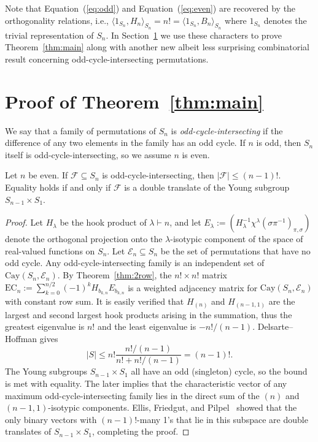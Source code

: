 \documentclass[12pt]{article}
\begin{document}
\noindent Note that Equation~(\ref{eq:odd}) and Equation~(\ref{eq:even}) are recovered by the orthogonality relations, i.e., $\langle 1_{S_n}, H_n \rangle_{S_n} = n! = \langle 1_{S_n}, B_n \rangle_{S_n}$ where $1_{S_n}$ denotes the trivial representation of $S_n$.
In Section~\ref{sec:proofs} we use these characters to prove Theorem~\ref{thm:main} along with another new albeit less surprising combinatorial result concerning odd-cycle-intersecting permutations. 


\section{Proof of Theorem~\ref{thm:main}}\label{sec:proofs}

We say that a family of permutations of $S_n$ is \emph{odd-cycle-intersecting} if the difference of any two elements in the family has an odd cycle. If $n$ is odd, then $S_n$ itself is odd-cycle-intersecting, so we assume $n$ is even. 
\begin{theorem}
Let $n$ be even. If $\mathcal{F} \subseteq S_n$ is odd-cycle-intersecting, then $|\mathcal{F}| \leq (n-1)!$. Equality holds if and only if $\mathcal{F}$ is a double translate of the Young subgroup $S_{n-1} \times S_1$.
\end{theorem}
\begin{proof}
 Let $H_\lambda$ be the hook product of $\lambda \vdash n$, and let $E_\lambda := (H_\lambda^{-1} \chi^\lambda(\sigma \pi^{-1})_{\pi,\sigma})$ denote the orthogonal projection onto the $\lambda$-isotypic component of the space of real-valued functions on $S_n$. Let $\mathcal{E}_n \subseteq S_n$ be the set of permutations that have no odd cycle. Any odd-cycle-intersecting family is an independent set of $\mathrm{Cay}(S_n, \mathcal{E}_n)$.
By Theorem~\ref{thm:2row}, the $n! \times n!$ matrix $\mathrm{EC}_n := \sum_{k=0}^{n/2} (-1)^k H_{b_{k,n}}E_{b_{k,n}}$ is a weighted adjacency matrix for $\mathrm{Cay}(S_n, \mathcal{E}_n)$ with constant row sum. It is easily verified that $H_{(n)}$ and $H_{(n-1,1)}$ are the largest and second largest hook products arising in the summation, thus the greatest eigenvalue is $n!$ and the least eigenvalue is $-n!/(n-1)$. Delsarte--Hoffman gives 
\[
	|S| \leq n! \frac{n!/(n-1)}{n! + n!/(n-1)} = (n-1)!.
\]
The Young subgroups $S_{n-1} \times S_1$ all have an odd (singleton) cycle, so the bound is met with equality. The later implies that the characteristic vector of any maximum odd-cycle-intersecting family lies in the direct sum of the $(n)$ and $(n-1,1)$-isotypic components. Ellis, Friedgut, and Pilpel~\cite{EllisFP11} showed that the only binary vectors with $(n-1)!$-many 1's that lie in this subspace are double translates of $S_{n-1} \times S_1$, completing the proof.
\end{proof}
\end{document}
